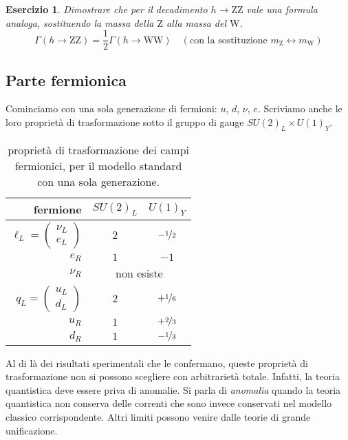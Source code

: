 \documentclass[italian,a4paper]{article}
\newtheorem{exercise}{Esercizio}
\theoremstyle{definition}
\newcommand{\zboson}{\ensuremath{\mathrm{Z}}}
\newcommand{\wboson}{\ensuremath{\mathrm{W}}}
\begin{document}
\begin{exercise}
    Dimostrare che per il decadimento $h \rightarrow \zboson\zboson$ vale una formula
    analoga, sostituendo la massa della $\zboson$ alla massa del $\wboson$.
    \begin{equation*}
        \Gamma(h \rightarrow \zboson \zboson) = \dfrac{1}{2} \Gamma(h
        \rightarrow \wboson \wboson) \quad (\text{con la sostituzione } m_{\zboson} \leftrightarrow
        m_{\wboson})
    \end{equation*}
\end{exercise}
\subsection{Parte fermionica}
Cominciamo con una sola generazione di fermioni: $u$, $d$, $\nu$, $e$.
Scriviamo anche le loro propriet\`a di trasformazione sotto il gruppo di
gauge $SU(2)_L \times U(1)_Y$.
\begin{table}[h!]
    \centering
    \begin{tabular}{r cc}
        \toprule
        fermione & $SU(2)_L$ & $U(1)_Y$ \\
        \midrule
        $\ell_L = 
        \begin{pmatrix}
            \nu_L \\ e_L
        \end{pmatrix}$
        & $2$ & $-\nicefrac{1}{2}$\\[.3cm]
        $e_R$ & $1$ & $-1$ \\[.3cm]
        $\nu_R$ & \multicolumn{2}{c}{non esiste} \\[.3cm]  
        $q_L = 
        \begin{pmatrix}
            u_L \\ d_L
        \end{pmatrix}$
        & $2$ & $+\nicefrac{1}{6}$\\[.3cm]  
        $u_R$ & $1$ &  $+\nicefrac{2}{3}$\\ [.3cm]  
        $d_R$ & $1$ &  $-\nicefrac{1}{3}$\\
        \bottomrule
    \end{tabular}
    \caption{propriet\`a di trasformazione dei campi fermionici, per il
    modello standard con una sola generazione.}
    \label{tab:fermioni}
\end{table}
Al di l\`a dei risultati sperimentali che le confermano, queste propriet\`a
di trasformazione non si possono scegliere con arbitrariet\`a totale.
Infatti, la teoria quantistica deve essere priva di anomalie. Si parla di
\emph{anomalia} quando la teoria quantistica non conserva delle correnti che
sono invece conservati nel modello classico corrispondente. Altri limiti
possono venire dalle teorie di grande unificazione.
\end{document}
